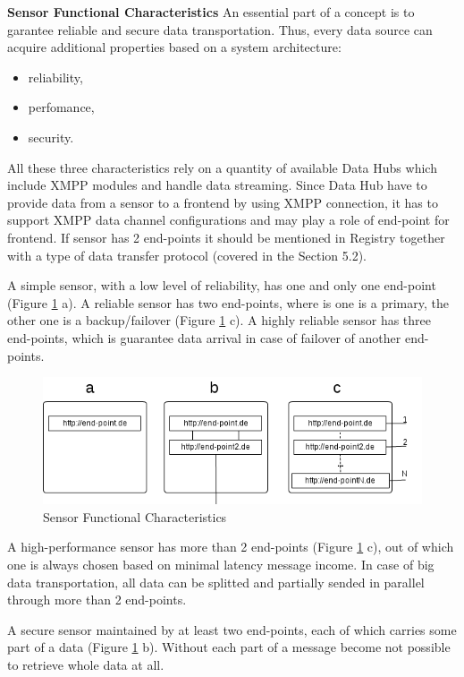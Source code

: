   \textbf{Sensor Functional Characteristics}
  \newline
  An essential part of a concept is to garantee reliable and secure data transportation. Thus, every data source can acquire additional properties based on a system architecture:
  \begin{itemize}
  \item reliability,
  \item perfomance,
  \item security.
  \end{itemize}
  All these three characteristics rely on a quantity of available Data Hubs which include XMPP modules and handle data streaming. Since Data Hub have to provide data from a sensor to a frontend by using XMPP connection, it has to support XMPP data channel configurations and may play a role of end-point for frontend. If sensor has 2 end-points it should be mentioned in Registry together with a type of data transfer protocol (covered in the Section 5.2).

  A simple sensor, with a low level of reliability, has one and only one end-point (Figure \ref{img:end_points} a). A reliable sensor has two end-points, where is one is a primary, the other one is a backup/failover (Figure \ref{img:end_points} c). A highly reliable sensor has three end-points, which is guarantee data arrival in case of failover of another end-points. 
     \begin{figure}[!ht]
     \centering
     \includegraphics[scale=0.6]{images/FuncCharacteristics.png}   
     \caption[MVC Pattern]{Sensor Functional Characteristics} 
     \label{img:end_points}                     
     \end{figure}
  A high-performance sensor has more than 2 end-points (Figure \ref{img:end_points} c), out of which one is always chosen based on minimal latency message income. In case of big data transportation, all data can be splitted and partially  sended in parallel through more than 2 end-points. 
    
  A secure sensor maintained by at least two end-points, each of which carries some part of a data (Figure \ref{img:end_points} b). Without each part of a message become not possible to retrieve whole data at all. 

